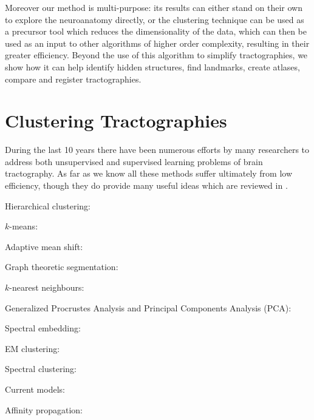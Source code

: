 \documentclass[preprint,authoryear,a4paper,10pt,onecolumn]{elsarticle}
\begin{document}
Moreover our method is multi-purpose: its results can either stand on
their own to explore the neuroanatomy directly, or the clustering
technique can be used as a precursor tool which reduces the
dimensionality of the data, which can then be used as an input to other
algorithms of higher order complexity, resulting in their greater
efficiency. Beyond the use of this algorithm to simplify tractographies,
we show how it can help identify hidden structures, find landmarks,
create atlases, compare and register tractographies.

\section{Clustering Tractographies}

During the last 10 years there have been numerous efforts by many
researchers to address both unsupervised and supervised learning
problems of brain tractography. As far as we know all these methods
suffer ultimately from low efficiency, though they do provide many
useful ideas which are reviewed in \citet{Garyfallidis_thesis}.

\begin{description}

\item[Hierarchical clustering:] \citep{Visser2010, gerig2004analysis,
    Guevara2010, zhang2005dti, jianu2009exploring}

\item[$k$-means:] \citep{ElKouby2005, Tsai2007}

\item[Adaptive mean shift:] \citep{zvitia2008adaptive, Zvitia2010}

\item[Graph theoretic segmentation:] \citep{brun2004clustering}

\item[$k$-nearest neighbours:] \citep{Ding2003a}

\item[Generalized Procrustes Analysis and Principal Components Analysis (PCA):]
\citep{Corouge2004, corouge2004towards, Corouge2006}

\item[Spectral embedding:] \citep{ODonnell_IEEETMI07}

\item[EM clustering:] \citep{Maddah_MICCA2005, maddah2006statistical,
Maddah_IEEEBI2008, ziyan2009consistency} 

\item[Spectral clustering:] \citep{jonasson2005fiber}

\item[Current models:] \citep{Durrleman2009,Durrleman2009, durrleman2010registration}

\item[Affinity propagation:] \citep{leemans17new, malcolm2009filtered}

\end{description}
\end{document}
